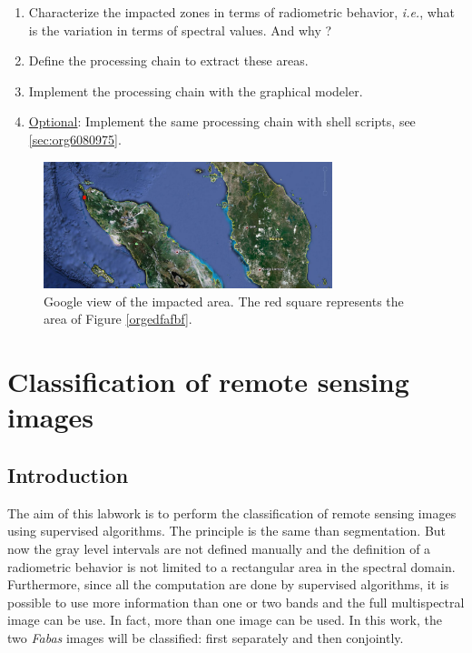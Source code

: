 \documentclass[a4paper,11pt,DIV=18]{scrartcl}
\begin{document}
\begin{work}
\begin{enumerate}
\item Characterize the  impacted zones in terms  of radiometric behavior,
\emph{i.e.}, what is the variation in terms of spectral values. And why ?
\item Define the processing chain to extract these areas.
\item Implement the processing chain with the graphical modeler.
\item \uline{Optional}: Implement  the same processing chain  with shell scripts,
see \ref{sec:org6080975}.
\end{enumerate}
\end{work}

\begin{figure}[htbp]
\centering
\includegraphics[width=0.75\textwidth]{./figures/google_bridge.jpg}
\caption{\label{fig:orgd33c02e}
Google view of the impacted area. The red square represents the area of Figure \ref{orgedfafbf}.}
\end{figure}

\section{Classification of remote sensing images}
\label{sec:org76b2918}
\subsection{Introduction}
\label{sec:org588bab8}
The aim  of this labwork  is to  perform the classification  of remote
sensing images using supervised algorithms.  The principle is the same
than segmentation.  But  now the gray level intervals  are not defined
manually and the  definition of a radiometric behavior  is not limited
to a rectangular area in  the spectral domain.  Furthermore, since all
the computation are  done by supervised algorithms, it  is possible to
use more information than one or  two bands and the full multispectral
image can be use.  In fact, more  than one image can be used.  In this
work, the  two \emph{Fabas} images  will be classified: first  separately and
then conjointly.
\end{document}
